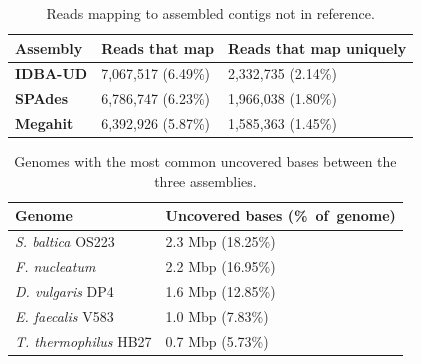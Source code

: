 \documentclass[10pt,a4paper,twocolumn]{article}
\begin{document}
\begin{table}[!ht]
\caption{Reads mapping to assembled contigs not in reference.}
\centering
\begin{tabular}{|p{2cm}|p{2.5cm}|p{2.5cm}|} 
\hline

\textbf{Assembly}& \textbf{Reads that map} &  \textbf{Reads that map uniquely}    \\ [0.5ex] %
\hline
\textbf{IDBA-UD}&7,067,517 (6.49\%) &2,332,735 (2.14\%)\\
\hline
\textbf{SPAdes}&6,786,747 (6.23\%)&1,966,038 (1.80\%)  \\
\hline
\textbf{Megahit}&6,392,926 (5.87\%)&1,585,363 (1.45\%)  \\
\hline
\end{tabular}
\label{table:read-mapping} 
\end{table}
\begin{table}[!h]
 \centering
 \caption{Genomes with the most common uncovered bases between the three assemblies.}
 \begin{tabular}{|p{4.50cm}|p{2.75cm}|} \hline
\textbf{Genome} & \textbf{Uncovered bases (\%~of~genome)} \\ \hline 
{\em S. baltica} OS223 & 2.3 Mbp (18.25\%) \\ \hline
{\em F. nucleatum} & 2.2 Mbp (16.95\%) \\ \hline
{\em D. vulgaris} DP4 & 1.6 Mbp (12.85\%) \\ \hline
{\em E. faecalis} V583 & 1.0 Mbp (7.83\%) \\ \hline
{\em T. thermophilus} HB27 & 0.7 Mbp (5.73\%) \\ \hline
\end{tabular}
\label{table:genomes_uncovered}
\end{table}

\end{document}
